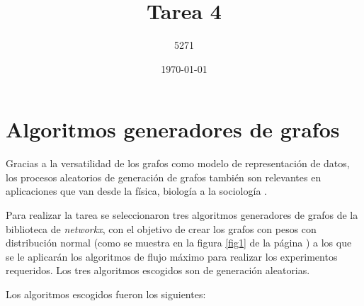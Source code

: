 \documentclass{article}
\title{Tarea 4}
\author{5271}
\date{\today}
\begin{document}
\maketitle

\section{Algoritmos generadores de grafos}

Gracias a la versatilidad de los grafos como modelo de representación de datos, los procesos aleatorios de generación de grafos también son relevantes en aplicaciones que van desde la física, biología a la sociología \cite{Nobari}.

Para realizar la tarea se seleccionaron tres algoritmos generadores de grafos de la biblioteca de \textit{networkx}, con el objetivo de crear los grafos con pesos con distribución normal (como se muestra en la figura \ref{fig1} de la página \pageref{fig1}) a los que se le aplicarán los algoritmos de flujo máximo para realizar los experimentos requeridos. Los tres algoritmos escogidos son de generación aleatorias.
 
Los algoritmos escogidos fueron los siguientes:
\end{document}
